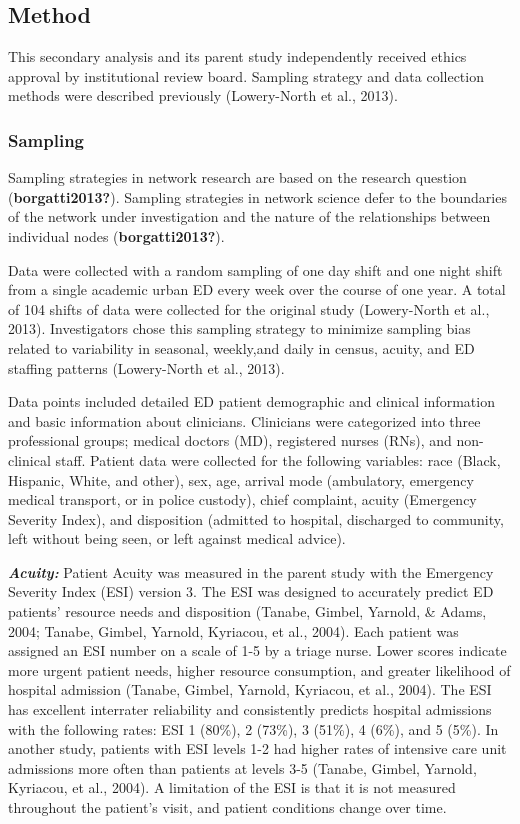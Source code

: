 \documentclass[
]{article}
\begin{document}
\hypertarget{method-1}{%
\subsection{Method}\label{method-1}}

This secondary analysis and its parent study independently received
ethics approval by institutional review board. Sampling strategy and
data collection methods were described previously (Lowery-North et al.,
2013).

\hypertarget{sampling}{%
\subsubsection{Sampling}\label{sampling}}

Sampling strategies in network research are based on the research
question (\textbf{borgatti2013?}). Sampling strategies in network
science defer to the boundaries of the network under investigation and
the nature of the relationships between individual nodes
(\textbf{borgatti2013?}).

Data were collected with a random sampling of one day shift and one
night shift from a single academic urban ED every week over the course
of one year. A total of 104 shifts of data were collected for the
original study (Lowery-North et al., 2013). Investigators chose this
sampling strategy to minimize sampling bias related to variability in
seasonal, weekly,and daily in census, acuity, and ED staffing patterns
(Lowery-North et al., 2013).

Data points included detailed ED patient demographic and clinical
information and basic information about clinicians. Clinicians were
categorized into three professional groups; medical doctors (MD),
registered nurses (RNs), and non-clinical staff. Patient data were
collected for the following variables: race (Black, Hispanic, White, and
other), sex, age, arrival mode (ambulatory, emergency medical transport,
or in police custody), chief complaint, acuity (Emergency Severity
Index), and disposition (admitted to hospital, discharged to community,
left without being seen, or left against medical advice).

\textbf{\emph{Acuity:}} Patient Acuity was measured in the parent study
with the Emergency Severity Index (ESI) version 3. The ESI was designed
to accurately predict ED patients' resource needs and disposition
(Tanabe, Gimbel, Yarnold, \& Adams, 2004; Tanabe, Gimbel, Yarnold,
Kyriacou, et al., 2004). Each patient was assigned an ESI number on a
scale of 1-5 by a triage nurse. Lower scores indicate more urgent
patient needs, higher resource consumption, and greater likelihood of
hospital admission (Tanabe, Gimbel, Yarnold, Kyriacou, et al., 2004).
The ESI has excellent interrater reliability and consistently predicts
hospital admissions with the following rates: ESI 1 (80\%), 2 (73\%), 3
(51\%), 4 (6\%), and 5 (5\%). In another study, patients with ESI levels
1-2 had higher rates of intensive care unit admissions more often than
patients at levels 3-5 (Tanabe, Gimbel, Yarnold, Kyriacou, et al.,
2004). A limitation of the ESI is that it is not measured throughout the
patient's visit, and patient conditions change over time.
\end{document}
